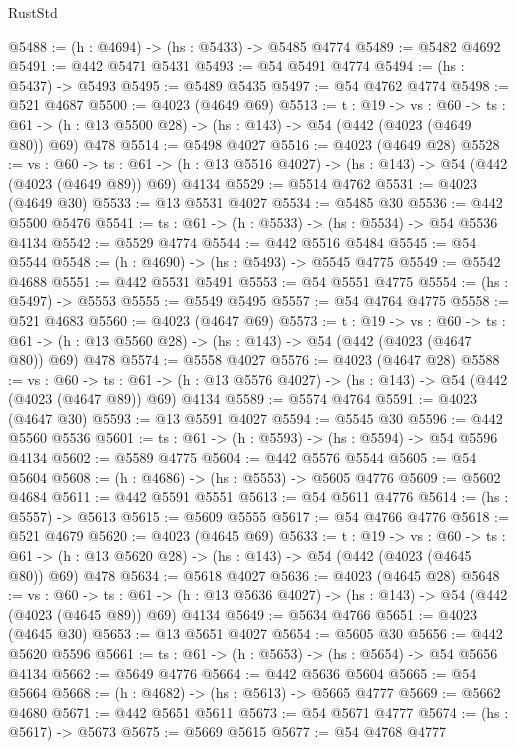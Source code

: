 \begin{lexlean}{RustStd}
\begin{coremodule}
@5488 := (h : @4694) -> (hs : @5433) -> @5485 @4774
@5489 := @5482 @4692
@5491 := @442 @5471 @5431
@5493 := @54 @5491 @4774
@5494 := (hs : @5437) -> @5493
@5495 := @5489 @5435
@5497 := @54 @4762 @4774
@5498 := @521 @4687
@5500 := @4023 (@4649 @69)
@5513 := {t : @19} ->
  {vs : @60} ->
  {ts : @61} -> (h : @13 @5500 @28) -> (hs : @143) -> @54 (@442 (@4023 (@4649 @80)) @69) @478
@5514 := @5498 @4027
@5516 := @4023 (@4649 @28)
@5528 := {vs : @60} ->
  {ts : @61} -> (h : @13 @5516 @4027) -> (hs : @143) -> @54 (@442 (@4023 (@4649 @89)) @69) @4134
@5529 := @5514 @4762
@5531 := @4023 (@4649 @30)
@5533 := @13 @5531 @4027
@5534 := @5485 @30
@5536 := @442 @5500 @5476
@5541 := {ts : @61} -> (h : @5533) -> (hs : @5534) -> @54 @5536 @4134
@5542 := @5529 @4774
@5544 := @442 @5516 @5484
@5545 := @54 @5544
@5548 := (h : @4690) -> (hs : @5493) -> @5545 @4775
@5549 := @5542 @4688
@5551 := @442 @5531 @5491
@5553 := @54 @5551 @4775
@5554 := (hs : @5497) -> @5553
@5555 := @5549 @5495
@5557 := @54 @4764 @4775
@5558 := @521 @4683
@5560 := @4023 (@4647 @69)
@5573 := {t : @19} ->
  {vs : @60} ->
  {ts : @61} -> (h : @13 @5560 @28) -> (hs : @143) -> @54 (@442 (@4023 (@4647 @80)) @69) @478
@5574 := @5558 @4027
@5576 := @4023 (@4647 @28)
@5588 := {vs : @60} ->
  {ts : @61} -> (h : @13 @5576 @4027) -> (hs : @143) -> @54 (@442 (@4023 (@4647 @89)) @69) @4134
@5589 := @5574 @4764
@5591 := @4023 (@4647 @30)
@5593 := @13 @5591 @4027
@5594 := @5545 @30
@5596 := @442 @5560 @5536
@5601 := {ts : @61} -> (h : @5593) -> (hs : @5594) -> @54 @5596 @4134
@5602 := @5589 @4775
@5604 := @442 @5576 @5544
@5605 := @54 @5604
@5608 := (h : @4686) -> (hs : @5553) -> @5605 @4776
@5609 := @5602 @4684
@5611 := @442 @5591 @5551
@5613 := @54 @5611 @4776
@5614 := (hs : @5557) -> @5613
@5615 := @5609 @5555
@5617 := @54 @4766 @4776
@5618 := @521 @4679
@5620 := @4023 (@4645 @69)
@5633 := {t : @19} ->
  {vs : @60} ->
  {ts : @61} -> (h : @13 @5620 @28) -> (hs : @143) -> @54 (@442 (@4023 (@4645 @80)) @69) @478
@5634 := @5618 @4027
@5636 := @4023 (@4645 @28)
@5648 := {vs : @60} ->
  {ts : @61} -> (h : @13 @5636 @4027) -> (hs : @143) -> @54 (@442 (@4023 (@4645 @89)) @69) @4134
@5649 := @5634 @4766
@5651 := @4023 (@4645 @30)
@5653 := @13 @5651 @4027
@5654 := @5605 @30
@5656 := @442 @5620 @5596
@5661 := {ts : @61} -> (h : @5653) -> (hs : @5654) -> @54 @5656 @4134
@5662 := @5649 @4776
@5664 := @442 @5636 @5604
@5665 := @54 @5664
@5668 := (h : @4682) -> (hs : @5613) -> @5665 @4777
@5669 := @5662 @4680
@5671 := @442 @5651 @5611
@5673 := @54 @5671 @4777
@5674 := (hs : @5617) -> @5673
@5675 := @5669 @5615
@5677 := @54 @4768 @4777

\end{coremodule}
\end{lexlean}
